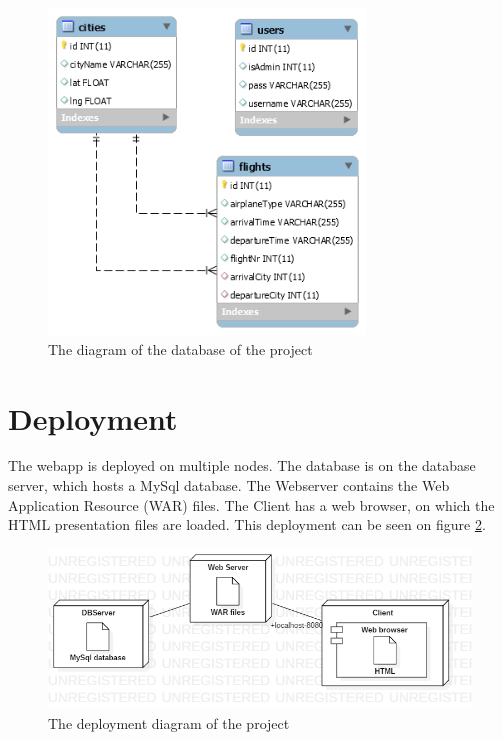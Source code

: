\documentclass[a4paper,10pt]{report}
\begin{document}
\begin{figure}[h]
    \centering
    \includegraphics[width=0.75\textwidth]{database_diagram.png}
    \caption{The diagram of the database of the project}
    \label{fig:database_diagram}
\end{figure}

\section{Deployment}
The webapp is deployed on multiple nodes.
The database is on the database server, which hosts a MySql database.
The Webserver contains the Web Application Resource (WAR) files.
The Client has a web browser, on which the HTML presentation files are loaded.
This deployment can be seen on figure \ref{fig:deployment_diagram}.

\begin{figure}[h]
    \centering
    \includegraphics[width=1\textwidth]{deployment_diagram.png}
    \caption{The deployment diagram of the project}
    \label{fig:deployment_diagram}
\end{figure}
\end{document}
